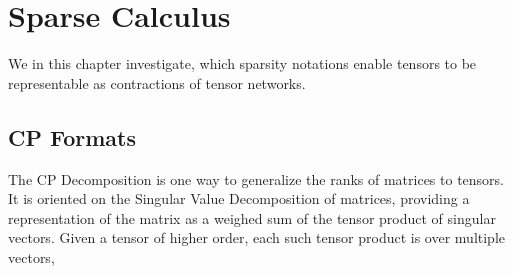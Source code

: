 \section{Sparse Calculus}\label{cha:sparseCalculus}

We in this chapter investigate, which sparsity notations enable tensors to be representable as contractions of tensor networks.


\subsection{CP Formats}

The CP Decomposition is one way to generalize the ranks of matrices to tensors.
It is oriented on the Singular Value Decomposition of matrices, providing a representation of the matrix as a weighed sum of the tensor product of singular vectors.
Given a tensor of higher order, each such tensor product is over multiple vectors, 

